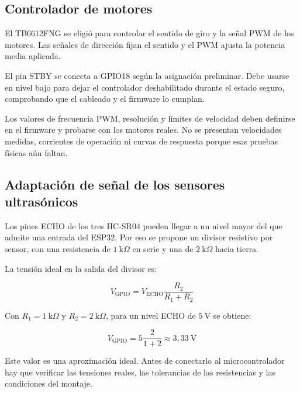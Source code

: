 \documentclass[journal]{IEEEtran}
\begin{document}
\subsection{Controlador de motores}

El TB6612FNG se eligió para controlar el sentido de giro y la señal PWM de los motores. Las señales de dirección fijan el sentido y el PWM ajusta la potencia media aplicada.

El pin STBY se conecta a GPIO18 según la asignación preliminar. Debe usarse en nivel bajo para dejar el controlador deshabilitado durante el estado seguro, comprobando que el cableado y el firmware lo cumplan.

Los valores de frecuencia PWM, resolución y límites de velocidad deben definirse en el firmware y probarse con los motores reales. No se presentan velocidades medidas, corrientes de operación ni curvas de respuesta porque esas pruebas físicas aún faltan.

\subsection{Adaptación de señal de los sensores ultrasónicos}

Los pines ECHO de los tres HC-SR04 pueden llegar a un nivel mayor del que admite una entrada del ESP32. Por eso se propone un divisor resistivo por sensor, con una resistencia de $1~\mathrm{k}\Omega$ en serie y una de $2~\mathrm{k}\Omega$ hacia tierra.

La tensión ideal en la salida del divisor es:

\begin{equation}
V_{\mathrm{GPIO}} =
V_{\mathrm{ECHO}}\frac{R_2}{R_1+R_2}
\label{eq:divisor}
\end{equation}

Con $R_1=1~\mathrm{k}\Omega$ y $R_2=2~\mathrm{k}\Omega$, para un nivel ECHO de $5~\mathrm{V}$ se obtiene:

\begin{equation}
V_{\mathrm{GPIO}} =
5\frac{2}{1+2}
\approx 3{,}33~\mathrm{V}
\label{eq:divisor_calculo}
\end{equation}

Este valor es una aproximación ideal. Antes de conectarlo al microcontrolador hay que verificar las tensiones reales, las tolerancias de las resistencias y las condiciones del montaje.

\end{document}
